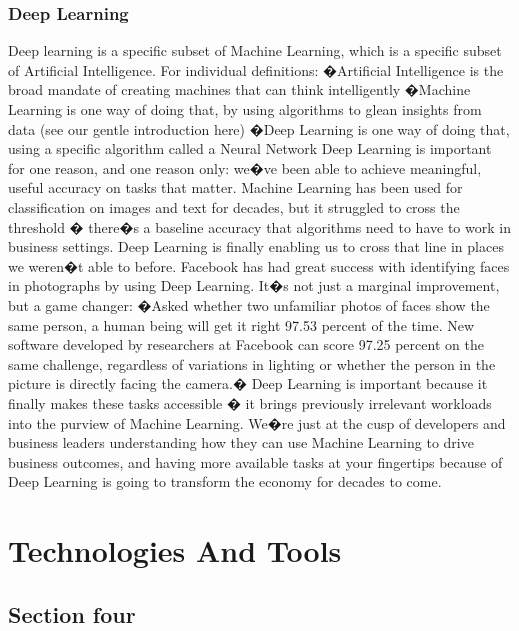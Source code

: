 \subsection{Deep Learning}
Deep learning is a specific subset of Machine Learning, which is a specific subset of Artificial Intelligence. For individual definitions:
�Artificial Intelligence is the broad mandate of creating machines that can think intelligently
�Machine Learning is one way of doing that, by using algorithms to glean insights from data (see our gentle introduction here)
�Deep Learning is one way of doing that, using a specific algorithm called a Neural Network
Deep Learning is important for one reason, and one reason only: we�ve been able to achieve meaningful, useful accuracy on tasks that matter. Machine Learning has been used for classification on images and text for decades, but it struggled to cross the threshold � there�s a baseline accuracy that algorithms need to have to work in business settings. Deep Learning is finally enabling us to cross that line in places we weren�t able to before.
Facebook has had great success with identifying faces in photographs by using Deep Learning. It�s not just a marginal improvement, but a game changer: �Asked whether two unfamiliar photos of faces show the same person, a human being will get it right 97.53 percent of the time. New software developed by researchers at Facebook can score 97.25 percent on the same challenge, regardless of variations in lighting or whether the person in the picture is directly facing the camera.�
Deep Learning is important because it finally makes these tasks accessible � it brings previously irrelevant workloads into the purview of Machine Learning. We�re just at the cusp of developers and business leaders understanding how they can use Machine Learning to drive business outcomes, and having more available tasks at your fingertips because of Deep Learning is going to transform the economy for decades to come.



\chapter{Technologies And Tools}
\label{chap:chap5}

\section{Section four}

